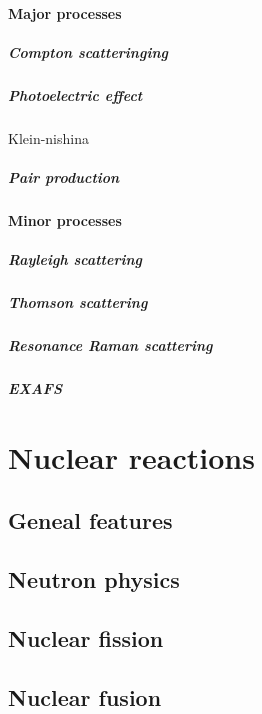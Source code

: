 \subsubsection{Major processes}
\paragraph{Compton scatteringing}
\paragraph{Photoelectric effect}
Klein-nishina
\paragraph{Pair production}
\subsubsection{Minor processes}
\paragraph{Rayleigh scattering}
\paragraph{Thomson scattering}
\paragraph{Resonance Raman scattering}
\paragraph{EXAFS}

\chapter{Nuclear reactions}
\section{Geneal features}
\section{Neutron physics}
\section{Nuclear fission}
\section{Nuclear fusion}